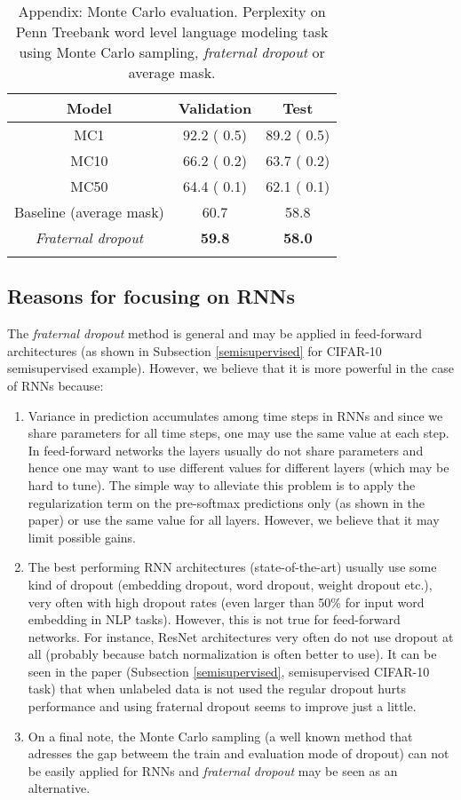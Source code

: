\documentclass{article} \usepackage{iclr2018_conference,times}
\begin{document}
\begin{table}[ht]
\vspace{-0.08cm}
\centering
\begin{tabular}{c | c c} 
\textbf{Model} & \textbf{Validation} & \textbf{Test}\\
\hline
MC1 & 92.2 ( 0.5) & 89.2 ( 0.5)\\
MC10 & 66.2 ( 0.2) & 63.7 ( 0.2)\\
MC50 & 64.4 ( 0.1) & 62.1 ( 0.1)\\
Baseline (average mask) & 60.7 & 58.8\\
\emph{Fraternal dropout} & \textbf{59.8} & \textbf{58.0}\\
\vspace{-0.08cm}
\end{tabular}
\caption{Appendix: Monte Carlo evaluation. Perplexity on Penn Treebank word level language modeling task using Monte Carlo sampling, \emph{fraternal dropout} or average mask.}
\label{table:MC-eval}
\end{table}

\newpage
\subsection*{Reasons for focusing on RNNs}
The \emph{fraternal dropout} method is general and may be applied in feed-forward architectures (as shown in Subsection \ref{semisupervised} for CIFAR-10 semisupervised example). However, we believe that it is more powerful in the case of RNNs because:
\begin{enumerate}
\item Variance in prediction accumulates among time steps in RNNs and since we share parameters for all time steps, one may use the same  value at each step. In feed-forward networks the layers usually do not share parameters and hence one may want to use different   values for different layers (which may be hard to tune). The simple way to alleviate this problem is to apply the regularization term on the pre-softmax predictions only (as shown in the paper) or use the same   value for all layers. However, we believe that it may limit possible gains.
\item The best performing RNN architectures (state-of-the-art) usually use some kind of dropout (embedding dropout, word dropout, weight dropout etc.), very often with high dropout rates (even larger than 50\% for input word embedding in NLP tasks). However, this is not true for feed-forward networks. For instance, ResNet architectures very often do not use dropout at all (probably because batch normalization is often better to use). It can be seen in the paper (Subsection \ref{semisupervised}, semisupervised CIFAR-10 task) that when unlabeled data is not used the regular dropout hurts performance and using fraternal dropout seems to improve just a little.
\item On a final note, the Monte Carlo sampling (a well known method that adresses the gap betweem the train and evaluation mode of dropout) can not be easily applied for RNNs and \emph{fraternal dropout} may be seen as an alternative.
\end{enumerate}
\end{document}

